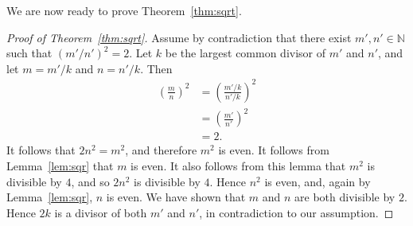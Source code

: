 \documentclass[12pt]{amsart}
\theoremstyle{definition}
\numberwithin{equation}{section}
\numberwithin{theorem}{section}
\begin{document}
We are now ready to prove Theorem~\ref{thm:sqrt}.
\begin{proof}[Proof of Theorem~\ref{thm:sqrt}]
  Assume by contradiction that there exist $m',n' \in \mathbb{N}$ such
  that $(m'/n')^2 = 2$. Let $k$ be the largest common divisor of $m'$ and
  $n'$, and let $m=m'/k$ and $n=n'/k$. Then
  \begin{align*}
    \left(\frac{m}{n}\right)^2 &= \left(\frac{m'/k}{n'/k}\right)^2\\
    &= \left(\frac{m'}{n'}\right)^2\\
    &= 2.
  \end{align*}
  It follows that $2n^2=m^2$, and therefore $m^2$ is even. It follows
  from Lemma~\ref{lem:sqr} that $m$ is even. It also follows from this
  lemma that $m^2$ is divisible by $4$, and so $2n^2$ is divisible by
  $4$. Hence $n^2$ is even, and, again by Lemma~\ref{lem:sqr}, $n$ is
  even. We have shown that $m$ and $n$ are both divisible by
  $2$. Hence $2k$ is a divisor of both $m'$ and $n'$, in contradiction
  to our assumption.
\end{proof}



%
\end{document}
